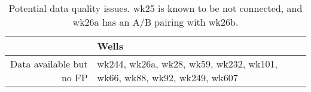 \begin{table}[ht]
\centering
\begin{tabular}{rl}
  \hline
 & Wells \\ 
  \hline
Data available but no FP & wk244, wk26a, wk28, wk59, wk232, wk101, wk66, wk88, wk92, wk249, wk607 \\ 
   \hline
\end{tabular}
\caption{Potential data quality issues. wk25 is known to be not connected, and wk26a has an A/B pairing with wk26b.} 
\label{tab:quality}
\end{table}
